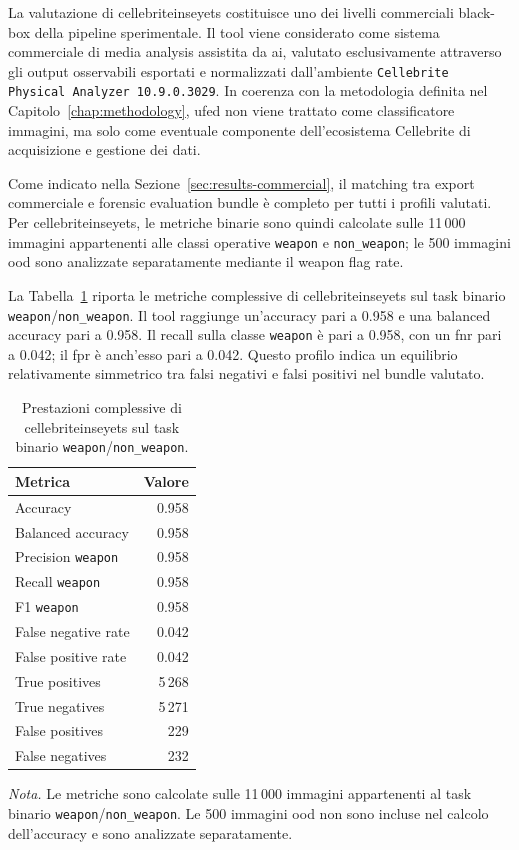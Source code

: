 La valutazione di \gls{cellebriteinseyets} costituisce uno dei livelli
commerciali black-box della pipeline sperimentale. Il tool viene considerato come sistema
commerciale di media analysis assistita da \gls{ai}, valutato esclusivamente
attraverso gli output osservabili esportati e normalizzati dall'ambiente
\texttt{Cellebrite Physical Analyzer 10.9.0.3029}. In coerenza con la
metodologia definita nel Capitolo~\ref{chap:methodology}, \gls{ufed} non viene
trattato come classificatore immagini, ma solo come eventuale componente
dell'ecosistema Cellebrite di acquisizione e gestione dei dati.

Come indicato nella Sezione~\ref{sec:results-commercial}, il matching tra
export commerciale e forensic evaluation bundle è completo per tutti i profili
valutati. Per \gls{cellebriteinseyets}, le metriche binarie sono quindi calcolate
sulle 11\,000 immagini appartenenti alle classi operative \texttt{weapon} e
\texttt{non\_weapon}; le 500 immagini \gls{ood} sono analizzate separatamente
mediante il weapon flag rate.

La Tabella~\ref{tab:results-cellebrite-global-metrics} riporta le metriche
complessive di \gls{cellebriteinseyets} sul task binario
\texttt{weapon}/\texttt{non\_weapon}. Il tool raggiunge un'accuracy pari a
0.958 e una balanced accuracy pari a 0.958. Il recall sulla classe
\texttt{weapon} è pari a 0.958, con un \gls{fnr} pari a 0.042; il \gls{fpr} è
anch'esso pari a 0.042. Questo profilo indica un equilibrio relativamente
simmetrico tra falsi negativi e falsi positivi nel bundle valutato.

\begin{table}[H]
\centering
\caption{Prestazioni complessive di \gls{cellebriteinseyets} sul task binario \texttt{weapon}/\texttt{non\_weapon}.}
\label{tab:results-cellebrite-global-metrics}
\small
\begin{tabular}{lr}
\toprule
\textbf{Metrica} & \textbf{Valore} \\
\midrule
Accuracy & 0.958 \\
Balanced accuracy & 0.958 \\
Precision \texttt{weapon} & 0.958 \\
Recall \texttt{weapon} & 0.958 \\
F1 \texttt{weapon} & 0.958 \\
False negative rate & 0.042 \\
False positive rate & 0.042 \\
True positives & 5\,268 \\
True negatives & 5\,271 \\
False positives & 229 \\
False negatives & 232 \\
\bottomrule
\end{tabular}

\vspace{0.4em}
\footnotesize
\textit{Nota.} Le metriche sono calcolate sulle 11\,000 immagini appartenenti al
task binario \texttt{weapon}/\texttt{non\_weapon}. Le 500 immagini \gls{ood} non
sono incluse nel calcolo dell'accuracy e sono analizzate separatamente.
\end{table}

